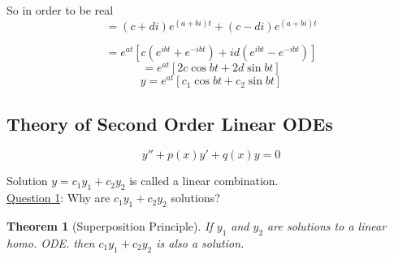 \documentclass[12pt]{article}
\numberwithin{equation}{subsection}
\newtheorem{theorem}{Theorem}[section]
\begin{document}
So in order to be real
\begin{equation}
=(c+di)e^{(a+bi)t}+(c-di)e^{(a+bi)t}
\end{equation}

\begin{equation}
=e^{at}\left[ c\left( e^{ibt}+e^{-ibt}\right)+ id\left(  e^{ibt}-e^{-ibt} \right) \right]
\end{equation}
\begin{equation}
=e^{at}\left[ 2c \cos bt + 2d\sin bt \right]
\end{equation}
\begin{equation}
y=e^{at}\left[ c_1 \cos bt + c_2\sin bt \right]
\end{equation}

\newpage
\subsection{Theory of Second Order Linear ODEs}
\begin{equation}
y''+p(x)y'+q(x)y=0
\end{equation}

Solution $y=c_1y_1+c_2y_2$ is called a linear combination.\\

\noindent \underline{Question 1}: Why are $c_1y_1+c_2y_2$ solutions?

\begin{theorem}[Superposition Principle]
If $y_1$ and $y_2$ are solutions to a linear homo. ODE. then $c_1y_1+c_2y_2$ is also a solution.
\end{theorem}
\end{document}
